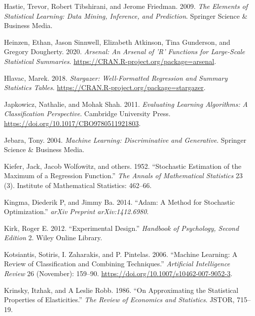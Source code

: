 \documentclass[12pt,]{article}
\begin{document}
\leavevmode\hypertarget{ref-hastie2009sl}{}%
Hastie, Trevor, Robert Tibshirani, and Jerome Friedman. 2009. \emph{The
Elements of Statistical Learning: Data Mining, Inference, and
Prediction}. Springer Science \& Business Media.

\leavevmode\hypertarget{ref-R-arsenal}{}%
Heinzen, Ethan, Jason Sinnwell, Elizabeth Atkinson, Tina Gunderson, and
Gregory Dougherty. 2020. \emph{Arsenal: An Arsenal of 'R' Functions for
Large-Scale Statistical Summaries}.
\url{https://CRAN.R-project.org/package=arsenal}.

\leavevmode\hypertarget{ref-R-stargazer}{}%
Hlavac, Marek. 2018. \emph{Stargazer: Well-Formatted Regression and
Summary Statistics Tables}.
\url{https://CRAN.R-project.org/package=stargazer}.

\leavevmode\hypertarget{ref-japkowicz2011el}{}%
Japkowicz, Nathalie, and Mohak Shah. 2011. \emph{Evaluating Learning
Algorithms: A Classification Perspective}. Cambridge University Press.
\url{https://doi.org/10.1017/CBO9780511921803}.

\leavevmode\hypertarget{ref-jebara2004ml}{}%
Jebara, Tony. 2004. \emph{Machine Learning: Discriminative and
Generative}. Springer Science \& Business Media.

\leavevmode\hypertarget{ref-kiefer1952stochastic}{}%
Kiefer, Jack, Jacob Wolfowitz, and others. 1952. ``Stochastic Estimation
of the Maximum of a Regression Function.'' \emph{The Annals of
Mathematical Statistics} 23 (3). Institute of Mathematical Statistics:
462--66.

\leavevmode\hypertarget{ref-kingma2014adam}{}%
Kingma, Diederik P, and Jimmy Ba. 2014. ``Adam: A Method for Stochastic
Optimization.'' \emph{arXiv Preprint arXiv:1412.6980}.

\leavevmode\hypertarget{ref-kirk2012experimental}{}%
Kirk, Roger E. 2012. ``Experimental Design.'' \emph{Handbook of
Psychology, Second Edition} 2. Wiley Online Library.

\leavevmode\hypertarget{ref-kotsiantis2006tr}{}%
Kotsiantis, Sotiris, I. Zaharakis, and P. Pintelas. 2006. ``Machine
Learning: A Review of Classification and Combining Techniques.''
\emph{Artificial Intelligence Review} 26 (November): 159--90.
\url{https://doi.org/10.1007/s10462-007-9052-3}.

\leavevmode\hypertarget{ref-krinsky1986approximating}{}%
Krinsky, Itzhak, and A Leslie Robb. 1986. ``On Approximating the
Statistical Properties of Elasticities.'' \emph{The Review of Economics
and Statistics}. JSTOR, 715--19.
\end{document}
